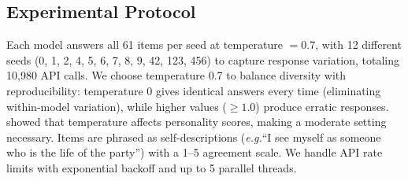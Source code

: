 \documentclass[11pt]{article}
\newcommand{\eg}{\textit{e.g.}\xspace}
\begin{document}
\begin{table}[!htb]
\centering
\footnotesize
\caption{Frontier replication cohort: 13 publicly available models collected through the unified LLM gateway in 2026-04. Two listed entries (GPT~5.4 and Doubao-Seed~1.6) returned only error responses and are reported with that caveat in Appendix~\ref{appendix:scoring}.}
\label{tab:models_sota}
\end{table}

\subsection{Experimental Protocol}
\label{sec:protocol}

Each model answers all 61 items per seed at temperature $= 0.7$, with 12 different seeds (0, 1, 2, 4, 5, 6, 7, 8, 9, 42, 123, 456) to capture response variation, totaling 10,980 API calls.
We choose temperature 0.7 to balance diversity with reproducibility: temperature 0 gives identical answers every time (eliminating within-model variation), while higher values ($\geq 1.0$) produce erratic responses.
\citet{jiang2023personality} showed that temperature affects personality scores, making a moderate setting necessary.
Items are phrased as self-descriptions (\eg ``I see myself as someone who is the life of the party'') with a 1--5 agreement scale.
We handle API rate limits with exponential backoff and up to 5 parallel threads.
\end{document}

